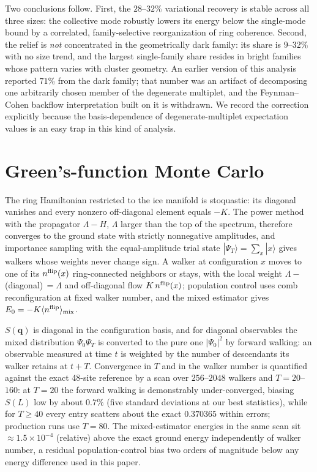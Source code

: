 \documentclass[aps,prl,twocolumn,amsmath,amssymb,superscriptaddress,
longbibliography,floatfix]{revtex4-2}
\newcommand{\bq}{\bm q}
\begin{document}
Two conclusions follow. First, the $28$--$32\%$ variational recovery
is stable across all three sizes: the collective mode robustly lowers
its energy below the single-mode bound by a correlated,
family-selective reorganization of ring coherence. Second, the
relief is \emph{not} concentrated in the geometrically dark family:
its share is $9$--$32\%$ with no size trend, and the largest
single-family share resides in bright families whose pattern varies
with cluster geometry. An earlier version of this analysis reported
$71\%$ from the dark family; that number was an artifact of
decomposing one arbitrarily chosen member of the degenerate
multiplet, and the Feynman--Cohen backflow interpretation built on it
is withdrawn. We record the correction explicitly because the
basis-dependence of degenerate-multiplet expectation values is an
easy trap in this kind of analysis.

\section{Green's-function Monte Carlo}
\label{sm:gfmc}


The ring Hamiltonian restricted to the ice manifold is stoquastic:
its diagonal vanishes and every nonzero off-diagonal element equals
$-K$. The power method with the propagator $\Lambda-H$, $\Lambda$
larger than the top of the spectrum, therefore converges to the ground
state with strictly nonnegative amplitudes, and importance sampling
with the equal-amplitude trial state $|\Psi_T\rangle=\sum_x|x\rangle$
gives walkers whose weights never change sign. A walker at
configuration $x$ moves to one of its $n^{\rm flip}(x)$ ring-connected
neighbors or stays, with the local weight
$\Lambda-\,$(diagonal)$\,=\Lambda$ and off-diagonal flow $K\,n^{\rm
flip}(x)$; population control uses comb reconfiguration at fixed
walker number, and the mixed estimator gives
$E_0=-K\langle n^{\rm flip}\rangle_{\rm mix}$.

$S(\bq)$ is diagonal in the configuration basis, and for diagonal
observables the mixed distribution $\Psi_0\Psi_T$ is converted to the
pure one $|\Psi_0|^2$ by forward walking: an observable measured at
time $t$ is weighted by the number of descendants its walker retains
at $t+T$. Convergence in $T$ and in the walker number is quantified
against the exact 48-site reference by a scan over $256$--$2048$
walkers and $T=20$--$160$: at $T=20$ the forward walking is
demonstrably under-converged, biasing $S(L)$ low by about $0.7\%$
(five standard deviations at our best statistics), while for
$T\ge40$ every entry scatters about the exact $0.370365$ within
errors; production runs use $T=80$. The mixed-estimator energies in
the same scan sit $\approx1.5\times10^{-4}$ (relative) above the
exact ground energy independently of walker number, a residual
population-control bias two orders of magnitude below any energy
difference used in this paper.
\end{document}
